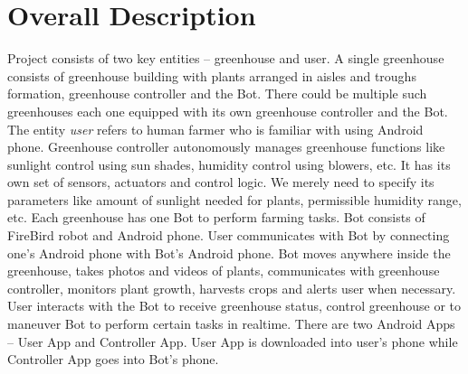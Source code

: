 \documentclass[a4paper, 12pt]{article}
\begin{document}
\section{Overall Description}
Project consists of two key entities -- greenhouse and user. A single greenhouse consists of greenhouse building with
plants arranged in aisles and troughs formation, greenhouse controller and the Bot. There could be multiple such 
greenhouses each one equipped with its own greenhouse controller and the Bot. The entity \emph{user} refers to human farmer 
who is familiar with using Android phone.
Greenhouse controller autonomously manages greenhouse functions like sunlight control using sun shades, humidity control using
blowers, etc. It has its own set of sensors, actuators and control logic. We merely need to specify its parameters like
amount of sunlight needed for plants, permissible humidity range, etc.
Each greenhouse has one Bot to perform farming tasks. Bot consists of FireBird robot and Android phone.
User communicates with Bot by connecting one's Android phone with Bot's Android phone.
Bot moves anywhere inside the greenhouse, takes photos and
videos of plants, communicates with greenhouse controller, monitors plant growth, harvests crops and alerts user when
necessary.
User interacts with the Bot to receive greenhouse status, control greenhouse or to maneuver Bot to perform certain 
tasks in realtime.
There are two Android Apps -- User App and Controller App. User App is downloaded into user's phone while Controller
App goes into Bot's phone.
\end{document}
